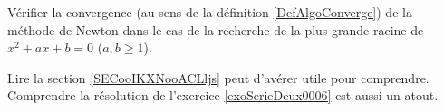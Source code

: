 
\begin{exercice}\label{exoSerieTrois0004}

	Vérifier la convergence (au sens de la définition \ref{DefAlgoConverge}) de la méthode de Newton dans le cas de la recherche de la plus grande racine de $x^2+ax+b=0$ ($a,b\geq1$).

	Lire la section \ref{SECooIKXNooACLljs} peut d'avérer utile pour comprendre. Comprendre la résolution de l'exercice \ref{exoSerieDeux0006} est aussi un atout.

\end{exercice}

